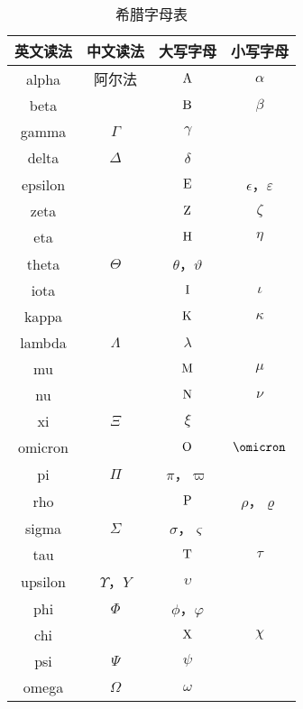 \begin{issues}
\issueDraft
\end{issues}

\begin{table}[ht]
\centering
\caption{希腊字母表}\label{tab_GreekL1}
\begin{tabular}{|c|c|c|c|}
\hline
英文读法 & 中文读法 & 大写字母 & 小写字母 \\
\hline
alpha & 阿尔法 & ${\rm A}$ & $\alpha$ \\
\hline
beta & & ${\rm B}$ & $\beta$ \\
\hline
gamma & $\Gamma$ & $\gamma$ \\
\hline
delta & $\Delta$ & $\delta$ \\
\hline
epsilon & & ${\rm E}$ & $\epsilon$，$\varepsilon$ \\
\hline
zeta & & ${\rm Z}$ & $\zeta$ \\
\hline
eta & & ${\rm H}$ & $\eta$ \\
\hline
theta & $\Theta$ & $\theta$，$\vartheta$ \\
\hline
iota & & ${\rm I}$ & $\iota$ \\
\hline
kappa & & ${\rm K}$ & $\kappa$ \\
\hline
lambda & $\Lambda$ & $\lambda$ \\
\hline
mu & & ${\rm M}$ & $\mu$ \\
\hline
nu & & ${\rm N}$ & $\nu$ \\
\hline
xi & $\Xi$ & $\xi$ \\
\hline
omicron & & ${\rm O}$ & $\omicron$ \\
\hline
pi & $\Pi$ & $\pi$，$\varpi$ \\
\hline
rho & & ${\rm P}$ & $\rho$，$\varrho$ \\
\hline
sigma & $\Sigma$ & $\sigma$，$\varsigma$ \\
\hline
tau & & ${\rm T}$ & $\tau$ \\
\hline
upsilon & $\Upsilon$，${Y}$ & $\upsilon$ \\
\hline
phi & $\Phi$ & $\phi$，$\varphi$ \\
\hline
chi & & ${\rm X}$ & $\chi$ \\
\hline
psi & $\Psi$ & $\psi$ \\
\hline
omega & $\Omega$ & $\omega$ \\
\hline
\end{tabular}
\end{table}







